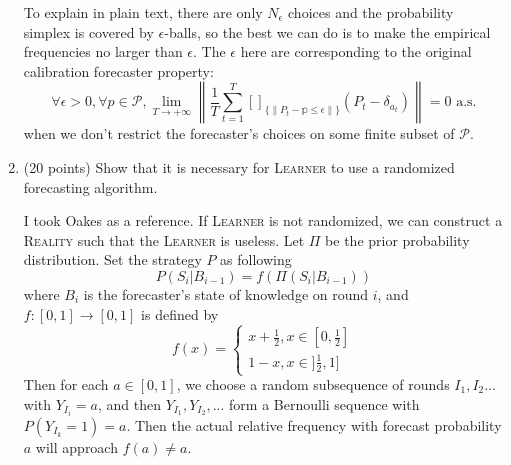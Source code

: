 \documentclass[a4paper, 12pt]{article}
\begin{document}
\begin{enumerate}
{    To explain in plain text, there are only $N_\epsilon$ choices and the probability simplex is covered by $\epsilon$-balls, so the best we can do is to make the empirical frequencies no larger than $\epsilon$. The $\epsilon$ here are corresponding to the original calibration forecaster property:
    \[\forall \epsilon > 0, \forall p \in \mathscr{P}, \lim_{T \to +\infty} \left\lVert \frac{1}{T} \sum_{t=1}^T []_{\{\lVert P_t - \mathbb{p} \leq \epsilon \rVert\}}(P_t - \delta_{a_t})\right\rVert = 0 \text{ a.s.}\]
    when we don't restrict the forecaster's choices on some finite subset of $\mathscr{P}$.
    }
    \item (20 points) Show that it is necessary for \textsc{Learner} to use a randomized forecasting algorithm.
    \par {\color{blue} I took Oakes\cite{oakes1985self} as a reference. If \textsc{Learner} is not randomized, we can construct a \textsc{Reality} such that the \textsc{Learner} is useless. Let $\Pi$ be the prior probability distribution. Set the strategy $P$ as following \[P(S_i | B_{i-1}) = f(\Pi (S_i | B_{i-1}))\] where $B_i$ is the forecaster's state of knowledge on round $i$, and $f: [0, 1] \to [0, 1]$ is defined by \[f(x) = \begin{cases}x+\frac{1}{2}, x \in [0, \frac{1}{2}] \\ 1 - x, x \in ]\frac{1}{2}, 1]\end{cases}\]
    Then for each $a \in [0, 1]$, we choose a random subsequence of rounds $I_1, I_2 ...$ with $Y_{I_i} = a$, and then $Y_{I_1}, Y_{I_2}, ...$ form a Bernoulli sequence with $P(Y_{I_k} = 1) = a$. Then the actual relative frequency with forecast probability $a$ will approach $f(a) \neq a$.
    }


\end{enumerate}
\end{document}
